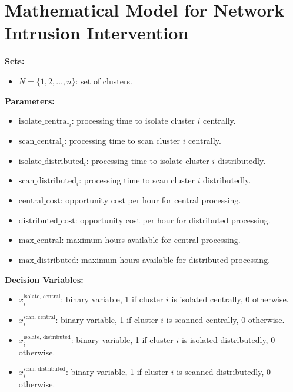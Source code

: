 \documentclass{article}
\begin{document}
\section*{Mathematical Model for Network Intrusion Intervention}

\textbf{Sets:}
\begin{itemize}
    \item \( N = \{1, 2, \ldots, n\} \): set of clusters.
\end{itemize}

\textbf{Parameters:}
\begin{itemize}
    \item \( \text{isolate\_central}_i \): processing time to isolate cluster \( i \) centrally.
    \item \( \text{scan\_central}_i \): processing time to scan cluster \( i \) centrally.
    \item \( \text{isolate\_distributed}_i \): processing time to isolate cluster \( i \) distributedly.
    \item \( \text{scan\_distributed}_i \): processing time to scan cluster \( i \) distributedly.
    \item \( \text{central\_cost} \): opportunity cost per hour for central processing.
    \item \( \text{distributed\_cost} \): opportunity cost per hour for distributed processing.
    \item \( \text{max\_central} \): maximum hours available for central processing.
    \item \( \text{max\_distributed} \): maximum hours available for distributed processing.
\end{itemize}

\textbf{Decision Variables:}
\begin{itemize}
    \item \( x_{i}^{\text{isolate, central}} \): binary variable, 1 if cluster \( i \) is isolated centrally, 0 otherwise.
    \item \( x_{i}^{\text{scan, central}} \): binary variable, 1 if cluster \( i \) is scanned centrally, 0 otherwise.
    \item \( x_{i}^{\text{isolate, distributed}} \): binary variable, 1 if cluster \( i \) is isolated distributedly, 0 otherwise.
    \item \( x_{i}^{\text{scan, distributed}} \): binary variable, 1 if cluster \( i \) is scanned distributedly, 0 otherwise.
\end{itemize}
\end{document}
